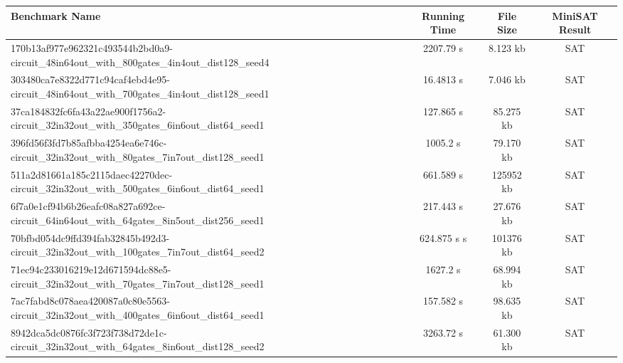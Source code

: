 \documentclass[runningheads]{llncs}
\begin{document}
\begin{adjustbox}{width=\textwidth,center}
\begin{tabular}{|p{16cm}|c|c|c|}
\hline
\textbf{Benchmark Name} & \textbf{Running Time} & \textbf{File Size} & \textbf{MiniSAT Result} \\ \hline
170b13af977e962321c493544b2bd0a9-circuit\_48in64out\_with\_800gates\_4in4out\_dist128\_seed4 & 2207.79 s & 8.123 kb & SAT \\ \hline
303480ca7e8322d771c94caf4ebd4e95-circuit\_48in64out\_with\_700gates\_4in4out\_dist128\_seed1 & 16.4813 s & 7.046 kb & SAT \\ \hline
37ca184832fc6fa43a22ae900f1756a2-circuit\_32in32out\_with\_350gates\_6in6out\_dist64\_seed1 & 
127.865 s & 85.275 kb & SAT \\ \hline
396fd56f3fd7b85afbba4254ea6e746c-circuit\_32in32out\_with\_80gates\_7in7out\_dist128\_seed1 & 
1005.2 s & 79.170 kb & SAT \\ \hline
511a2d81661a185c2115daec42270dec-circuit\_32in32out\_with\_500gates\_6in6out\_dist64\_seed1 & 
661.589 s & 125952 kb & SAT \\ \hline
6f7a0e1cf94b6b26eafc08a827a692ce-circuit\_64in64out\_with\_64gates\_8in5out\_dist256\_seed1 & 
217.443 s & 27.676 kb & SAT \\ \hline
70bfbd054dc9ffd394fab32845b492d3-circuit\_32in32out\_with\_100gates\_7in7out\_dist64\_seed2 & 
624.875 s s & 101376 kb & SAT \\ \hline
71ec94c233016219e12d671594dc88e5-circuit\_32in32out\_with\_70gates\_7in7out\_dist128\_seed1 & 
1627.2 s & 68.994 kb & SAT \\ \hline
7ac7fabd8c078aea420087a0c80e5563-circuit\_32in32out\_with\_400gates\_6in6out\_dist64\_seed1 & 
157.582 s & 98.635 kb & SAT \\ \hline
8942dca5dc0876fc3f723f738d72de1c-circuit\_32in32out\_with\_64gates\_8in6out\_dist128\_seed2 & 
3263.72 s & 61.300 kb & SAT \\ \hline
\end{tabular}
\end{adjustbox}
\\
\end{document}
